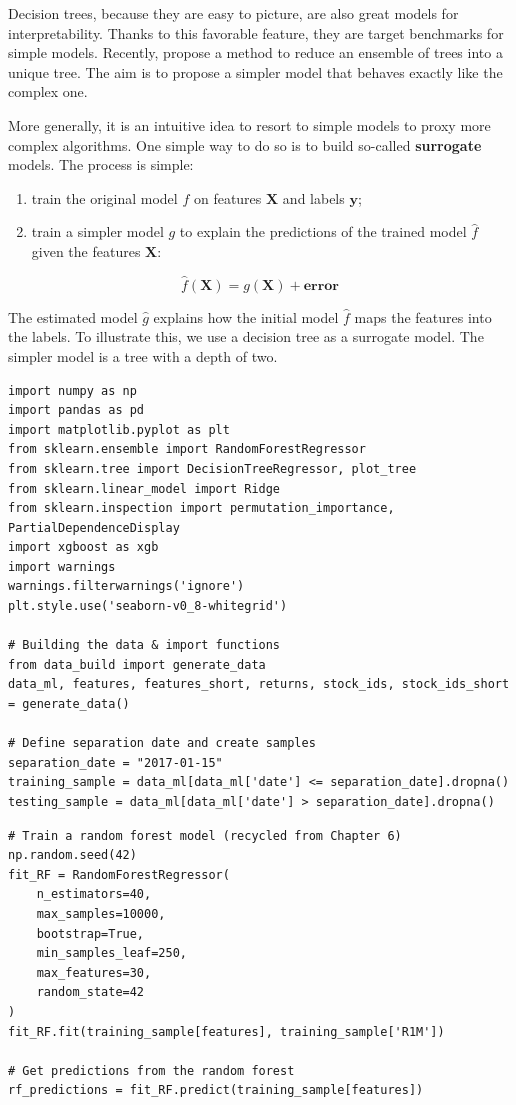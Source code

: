 Decision trees, because they are easy to picture, are also great models for interpretability. Thanks to this favorable feature, they are target benchmarks for simple models. Recently, \cite{vidal2020born} propose a method to reduce an ensemble of trees into a unique tree. The aim is to propose a simpler model that behaves exactly like the complex one.

More generally, it is an intuitive idea to resort to simple models to proxy more complex algorithms. One simple way to do so is to build so-called \textbf{surrogate} models. The process is simple:

\begin{enumerate}
\item train the original model $f$ on features $\textbf{X}$ and labels $\textbf{y}$;
\item train a simpler model $g$ to explain the predictions of the trained model $\hat{f}$ given the features $\textbf{X}$:
\end{enumerate}

\begin{equation}
\hat{f}(\textbf{X})=g(\textbf{X})+\textbf{error}
\end{equation}

The estimated model $\hat{g}$ explains how the initial model $\hat{f}$ maps the features into the labels. To illustrate this, we use a decision tree as a surrogate model. The simpler model is a tree with a depth of two.

\begin{verbatim}
import numpy as np
import pandas as pd
import matplotlib.pyplot as plt
from sklearn.ensemble import RandomForestRegressor
from sklearn.tree import DecisionTreeRegressor, plot_tree
from sklearn.linear_model import Ridge
from sklearn.inspection import permutation_importance, PartialDependenceDisplay
import xgboost as xgb
import warnings
warnings.filterwarnings('ignore')
plt.style.use('seaborn-v0_8-whitegrid')

# Building the data & import functions
from data_build import generate_data
data_ml, features, features_short, returns, stock_ids, stock_ids_short = generate_data()

# Define separation date and create samples
separation_date = "2017-01-15"
training_sample = data_ml[data_ml['date'] <= separation_date].dropna()
testing_sample = data_ml[data_ml['date'] > separation_date].dropna()
\end{verbatim}

\begin{verbatim}
# Train a random forest model (recycled from Chapter 6)
np.random.seed(42)
fit_RF = RandomForestRegressor(
    n_estimators=40,
    max_samples=10000,
    bootstrap=True,
    min_samples_leaf=250,
    max_features=30,
    random_state=42
)
fit_RF.fit(training_sample[features], training_sample['R1M'])

# Get predictions from the random forest
rf_predictions = fit_RF.predict(training_sample[features])
\end{verbatim}

